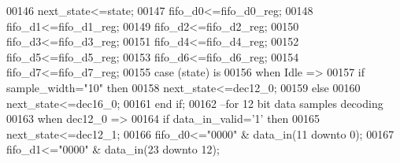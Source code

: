 \begin{DoxyCode}
00146       \textcolor{vhdlchar}{next_state}\textcolor{vhdlchar}{<=}\textcolor{vhdlchar}{state};
00147       \textcolor{vhdlchar}{fifo_d0}\textcolor{vhdlchar}{<=}\textcolor{vhdlchar}{fifo_d0_reg};
00148         \textcolor{vhdlchar}{fifo_d1}\textcolor{vhdlchar}{<=}\textcolor{vhdlchar}{fifo_d1_reg};
00149         \textcolor{vhdlchar}{fifo_d2}\textcolor{vhdlchar}{<=}\textcolor{vhdlchar}{fifo_d2_reg};
00150         \textcolor{vhdlchar}{fifo_d3}\textcolor{vhdlchar}{<=}\textcolor{vhdlchar}{fifo_d3_reg};
00151         \textcolor{vhdlchar}{fifo_d4}\textcolor{vhdlchar}{<=}\textcolor{vhdlchar}{fifo_d4_reg};
00152         \textcolor{vhdlchar}{fifo_d5}\textcolor{vhdlchar}{<=}\textcolor{vhdlchar}{fifo_d5_reg};
00153         \textcolor{vhdlchar}{fifo_d6}\textcolor{vhdlchar}{<=}\textcolor{vhdlchar}{fifo_d6_reg};
00154         \textcolor{vhdlchar}{fifo_d7}\textcolor{vhdlchar}{<=}\textcolor{vhdlchar}{fifo_d7_reg};  
00155             \textcolor{keywordflow}{case} \textcolor{vhdlchar}{(}\textcolor{vhdlchar}{state}\textcolor{vhdlchar}{)} \textcolor{keywordflow}{is}
00156              \textcolor{keywordflow}{when} \textcolor{vhdlchar}{Idle} \textcolor{vhdlchar}{=}\textcolor{vhdlchar}{>}
00157                \textcolor{keywordflow}{if} \textcolor{vhdlchar}{sample_width}\textcolor{vhdlchar}{=}\textcolor{vhdllogic}{"10"} \textcolor{keywordflow}{then}                 
00158                    \textcolor{vhdlchar}{next_state}\textcolor{vhdlchar}{<=}\textcolor{vhdlchar}{dec12\_0};
00159                \textcolor{keywordflow}{else} 
00160                    \textcolor{vhdlchar}{next_state}\textcolor{vhdlchar}{<=}\textcolor{vhdlchar}{dec16\_0};
00161                \textcolor{keywordflow}{end} \textcolor{keywordflow}{if};
00162 \textcolor{keyword}{--for 12 bit data samples decoding}
00163              \textcolor{keywordflow}{when} \textcolor{vhdlchar}{dec12\_0} \textcolor{vhdlchar}{=}\textcolor{vhdlchar}{>}
00164                \textcolor{keywordflow}{if} \textcolor{vhdlchar}{data_in_valid}\textcolor{vhdlchar}{=}\textcolor{vhdlchar}{'}\textcolor{vhdllogic}{}\textcolor{vhdllogic}{1}\textcolor{vhdlchar}{'} \textcolor{keywordflow}{then} 
00165                  \textcolor{vhdlchar}{next_state}\textcolor{vhdlchar}{<=}\textcolor{vhdlchar}{dec12\_1};
00166                  \textcolor{vhdlchar}{fifo_d0}\textcolor{vhdlchar}{<=}\textcolor{vhdllogic}{"0000"} \textcolor{vhdlchar}{&} \textcolor{vhdlchar}{data_in}\textcolor{vhdlchar}{(}\textcolor{vhdllogic}{}\textcolor{vhdllogic}{11} \textcolor{keywordflow}{downto} \textcolor{vhdllogic}{}\textcolor{vhdllogic}{0}\textcolor{vhdlchar}{)};
00167                  \textcolor{vhdlchar}{fifo_d1}\textcolor{vhdlchar}{<=}\textcolor{vhdllogic}{"0000"} \textcolor{vhdlchar}{&} \textcolor{vhdlchar}{data_in}\textcolor{vhdlchar}{(}\textcolor{vhdllogic}{}\textcolor{vhdllogic}{23} \textcolor{keywordflow}{downto} \textcolor{vhdllogic}{}\textcolor{vhdllogic}{12}\textcolor{vhdlchar}{)};      

\end{DoxyCode}
